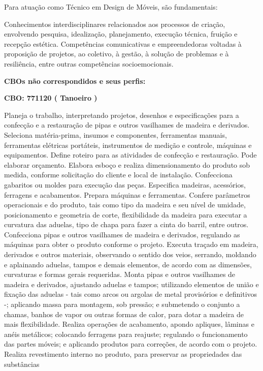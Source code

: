 \documentclass[
]{article}
\begin{document}
Para atuação como Técnico em Design de Móveis, são fundamentais:

Conhecimentos interdisciplinares relacionados aos processos de criação,
envolvendo pesquisa, idealização, planejamento, execução técnica,
fruição e recepção estética. Competências comunicativas e empreendedoras
voltadas à proposição de projetos, ao coletivo, à gestão, à solução de
problemas e à resiliência, entre outras competências socioemocionais.

\textbf{CBOs não correspondidos e seus perfis:}

\textbf{CBO: 771120  ( Tanoeiro )}

Planeja o trabalho, interpretando projetos, desenhos e especificações
para a confecção e a restauração de pipas e outros vasilhames de madeira
e derivados. Seleciona matéria-prima, insumos e componentes, ferramentas
manuais, ferramentas elétricas portáteis, instrumentos de medição e
controle, máquinas e equipamentos. Define roteiro para as atividades de
confecção e restauração. Pode elaborar orçamento. Elabora esboço e
realiza dimensionamento do produto sob medida, conforme solicitação do
cliente e local de instalação. Confecciona gabaritos ou moldes para
execução das peças. Especifica madeiras, acessórios, ferragens e
acabamentos. Prepara máquinas e ferramentas. Confere parâmetros
operacionais e do produto, tais como tipo da madeira e seu nível de
umidade, posicionamento e geometria de corte, flexibilidade da madeira
para executar a curvatura das aduelas, tipo de chapa para fazer a cinta
do barril, entre outros. Confecciona pipas e outros vasilhames de
madeira e derivados, regulando as máquinas para obter o produto conforme
o projeto. Executa traçado em madeira, derivados e outros materiais,
observando o sentido dos veios, serrando, moldando e aplainando aduelas,
tampos e demais elementos, de acordo com as dimensões, curvaturas e
formas gerais requeridas. Monta pipas e outros vasilhames de madeira e
derivados, ajustando aduelas e tampos; utilizando elementos de união e
fixação das aduelas - tais como arcos ou argolas de metal provisórios e
definitivos -; aplicando massa para montagem, sob pressão; e submetendo
o conjunto a chamas, banhos de vapor ou outras formas de calor, para
dotar a madeira de mais flexibilidade. Realiza operações de acabamento,
apondo apliques, lâminas e anéis metálicos; colocando ferragens para
reajuste; regulando o funcionamento das partes móveis; e aplicando
produtos para correções, de acordo com o projeto. Realiza revestimento
interno no produto, para preservar as propriedades das substâncias
\end{document}
